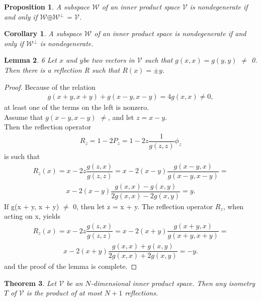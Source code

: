 \documentclass[12pt,a4paper]{article}
\newtheorem{thm}{Theorem}
\newtheorem{lem}[thm]{Lemma}
\newtheorem{cor}[thm]{Corollary}
\newtheorem{prop}{Proposition}
\begin{document}
\begin{prop}
A subspace $\mathcal{W}$ of an inner product space $\mathcal{V}$ is nondegenerate if and only if $\mathcal{W}$$\oplus$$\mathcal{W}$$^\perp$ = $\mathcal{V}$.
\end{prop}

\begin{cor}
A subspace $\mathcal{W}$ of an inner product space is nondegenerate if and only if $\mathcal{W}$$^\perp$ is nondegenerate.
\end{cor}
\begin{lem}
6 Let $x$ and $y $be two vectors in $\mathcal{V}$ such that $g(x, x) =
g(y, y)$ $\ne$ 0. \\Then there is a reflection R such that $R(x) = $$\pm y$.
\end{lem}
\begin{proof}
Because of the relation
\begin{align*}
g(x + y, x + y) + g(x -y, x - y) = 4g(x, x) \ne 0,
\end{align*}
at least one of the terms on the left is nonzero. \\Assume that $g(x -y, x - y)$ $\ne$, and let $z = x - y.$ \\Then the reflection operator
\begin{align*}
R_z = 1 - 2P_z = 1 - 2z \dfrac{1}{g(z, z)} \phi_z
\end{align*}
is such that 
\begin{align*}
R_z(x) = x - 2z\dfrac{g(z,x)}{g(z,z)} = x - 2(x-y)\dfrac{g(x - y, x)}{g(x - y, x -y)}=
\end{align*}
\begin{align*}
x - 2(x-y)\dfrac{g(x,x) - g(x, y)}{2g(x,x) - 2g(x,y)} = y.
\end{align*}
If g(x + y, x + y) $\neq$ 0, then let z = x + y. The reflection operator $R_z$, when acting on x, yields
\begin{align*}
R_z(x) = x - 2z\dfrac{g(z,x)}{g(z,z)} = x - 2(x + y)\dfrac{g(x+y,x)}{g(x+y, x+y)}=
\end{align*}
\begin{align*}
 x - 2(x+y)\dfrac{g(x,x) + g(x,y)}{2g(x,x) + 2g(x,y)} = -y.
\end{align*}
and the proof of the lemma is complete. 
\end{proof}
\begin{thm}
Let $\mathcal{V}$ be an $N$-dimensional inner product space.
Then any isometry $T$ of $\mathcal{V}$ is the product of at most $N + 1$ reflections.
\end{thm}
\end{document}
